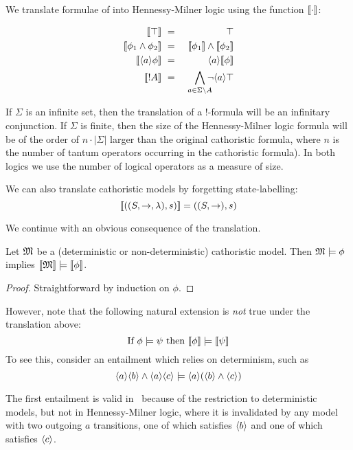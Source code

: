 \begin{definition}
 We translate formulae of \cathoristic{} into Hennessy-Milner logic
 using the function $\lbrack\!\lbrack \cdot \rbrack\!\rbrack$:

\begin{eqnarray*}
  \SEMB{\top} & \ = \ & \top  \\
  \SEMB{\phi_1 \AND \phi_2} & \ = \ & \SEMB{\phi_1} \AND \SEMB{\phi_2}  \\
  \SEMB{\langle a \rangle \phi} & \ = \ & \langle a \rangle \SEMB{\phi}  \\
  \SEMB{! A} & \ = \ & \bigwedge_{a \in \Sigma \setminus A}\!\!\!\! \neg \langle a \rangle \top 
\end{eqnarray*}

\end{definition}

\NI If $\Sigma$ is an infinite set, then the translation of a $!$-formula 
will be an infinitary conjunction.  If $\Sigma$ is finite, then
the size of the Hennessy-Milner logic formula will be of the order of $n \cdot | \Sigma |$
larger than the original cathoristic formula, where $n$ is the number of
tantum operators occurring in the cathoristic formula). In both logics we
use the number of logical operators as a measure of size.

We can also translate cathoristic models by forgetting state-labelling:
\[
   \lbrack\!\lbrack ((S, \rightarrow, \lambda), s) \rbrack\!\rbrack 
      =
   ((S, \rightarrow), s)
\]

\NI We continue with an obvious consequence of the translation.

\begin{theorem}
Let $\frak{M}$ be a (deterministic or non-deterministic) cathoristic
  model. Then $\frak{M} \models \phi$ implies $\lbrack\!\lbrack \frak{M} \rbrack\!\rbrack \models
  \lbrack\!\lbrack \phi \rbrack\!\rbrack$.
\end{theorem}
\begin{proof}
Straightforward by induction on $\phi$.
\end{proof}

\NI However, note that the following natural extension is \emph{not} true
under the translation above:
\[
  \text{If } \phi \models \psi \text{ then } \lbrack\!\lbrack \phi \rbrack\!\rbrack \models \lbrack\!\lbrack \psi \rbrack\!\rbrack
\]
To see this, consider an entailment which relies on determinism, such as
\[
\langle a \rangle \langle b \rangle \land \langle a \rangle \langle c \rangle \models \langle a \rangle (\langle b \rangle \land \langle c \rangle )
\]

\NI The first entailment is valid in \cathoristic\ because of the
restriction to deterministic models, but not in Hennessy-Milner
logic, where it is invalidated by any model with two outgoing $a$
transitions, one of which satisfies $\MAY{b}$ and one of which
satisfies $\MAY{c}$.

